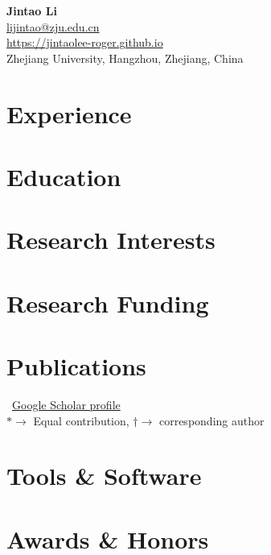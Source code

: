 \documentclass[11pt]{article}
\newcommand{\mytitle}[4]{
  \begin{center}
    \Large\textbf{#1}\normalsize \\
    \href{mailto:#2}{#2} \\
    \href{#3}{#3} \\
    #4
  \end{center}
}
\begin{document}
\mytitle{Jintao Li}{lijintao@zju.edu.cn}{https://jintaolee-roger.github.io}{Zhejiang University, Hangzhou, Zhejiang, China}

\RaggedRight
\setlength{\emergencystretch}{1em}

\section*{Experience}
\label{exp_research}


\section*{Education}
\label{education}

\section*{Research Interests}
\label{research_int}


\section*{Research Funding}
\label{funding}

\section*{Publications}
\label{pubs}

\vspace{-.75em}
\small
\faGoogle~\href{https://scholar.google.com/citations?user=_g2xGUwAAAAJ&hl=en}{Google Scholar profile}\\
$* \rightarrow$ Equal contribution, $\dagger \rightarrow$ corresponding author
\normalsize
\nocite{*}


\section*{Tools \& Software}
\label{tools}

\section*{Awards \& Honors}
\label{awards}

\end{document}
